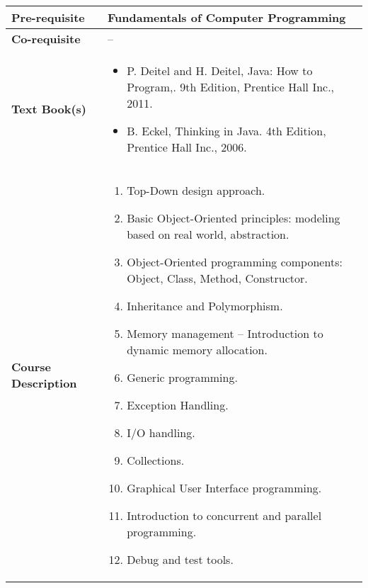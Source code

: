 \documentclass[12pt]{article}
\begin{document}
\begin{minipage}{\textwidth}
\begin{tabularx}{\textwidth}{|l|X|}
\hline
\textbf{Pre-requisite}      &  Fundamentals of Computer Programming \\ \hline
\textbf{Co-requisite}       &  -- \\ \hline
\textbf{Text Book(s)}      & \begin{minipage}{.70\textwidth}
					\begin{itemize} \itemsep-0.4em
						\vspace{3mm}
						\item P. Deitel and H. Deitel, Java: How to Program,. 9th Edition, Prentice Hall Inc., 2011.
						\item B. Eckel, Thinking in Java. 4th Edition, Prentice Hall Inc., 2006.
						\vspace{3mm}
					\end{itemize}
				\end{minipage}  \\ \hline
\textbf{Course Description} & \begin{minipage}{.70\textwidth}
					\vspace{3mm}
					\begin{enumerate}
						  \item Top-Down design approach.
						  \item Basic Object-Oriented principles: modeling based on real world, abstraction.
						  \item Object-Oriented programming components: Object, Class, Method, Constructor.
						  \item Inheritance and Polymorphism.
						  \item Memory management -- Introduction to dynamic memory allocation.
						  \item Generic programming.
						  \item Exception Handling.
						  \item I/O handling.
						  \item Collections.
						  \item Graphical User Interface programming.
						  \item Introduction to concurrent and parallel programming.
						  \item Debug and test tools.
					\end{enumerate}					

					\vspace{3mm}
					\end{minipage} \\ \hline
\end{tabularx}
\end{minipage}
\end{document}
